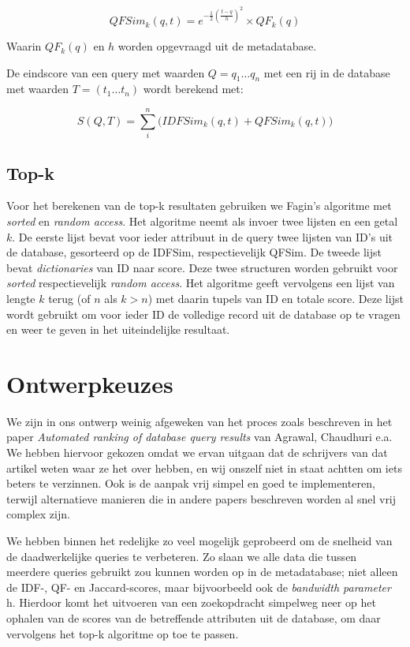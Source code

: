 \documentclass[a4paper,oneside]{article}
\begin{document}
$$QFSim_k(q, t) = e^{-\frac{1}{2}\left(\frac{t-q}{h}\right)^2}\times QF_k(q)$$

\noindent
Waarin $QF_k(q)$ en $h$ worden opgevraagd uit de metadatabase.

De eindscore van een query met waarden $Q={q_1\ldots q_n}$ met een rij in de database met waarden $T=(t_1\ldots t_n)$ wordt berekend met:

$$S(Q, T) = \sum\limits_i^n \big(IDFSim_k(q, t)+QFSim_k(q, t)\big)$$


\subsection{Top-k}
Voor het berekenen van de top-k resultaten gebruiken we Fagin's algoritme met \emph{sorted} en \emph{random access}. Het algoritme neemt als invoer twee lijsten en een getal $k$. De eerste lijst bevat voor ieder attribuut in de query twee lijsten van ID's uit de database, gesorteerd op de IDFSim, respectievelijk QFSim. De tweede lijst bevat \emph{dictionaries} van ID naar score. Deze twee structuren worden gebruikt voor \emph{sorted} respectievelijk \emph{random access}. Het algoritme geeft vervolgens een lijst van lengte $k$ terug (of $n$ als $k > n$) met daarin tupels van ID en totale score. Deze lijst wordt gebruikt om voor ieder ID de volledige record uit de database op te vragen en weer te geven in het uiteindelijke resultaat.


\section{Ontwerpkeuzes}
We zijn in ons ontwerp weinig afgeweken van het proces zoals beschreven in het paper \emph{Automated ranking of database query results} van Agrawal, Chaudhuri e.a. We hebben hiervoor gekozen omdat we ervan uitgaan dat de schrijvers van dat artikel weten waar ze het over hebben, en wij onszelf niet in staat achtten om iets beters te verzinnen. Ook is de aanpak vrij simpel en goed te implementeren, terwijl alternatieve manieren die in andere papers beschreven worden al snel vrij complex zijn.

We hebben binnen het redelijke zo veel mogelijk geprobeerd om de snelheid van de daadwerkelijke queries te verbeteren. Zo slaan we alle data die tussen meerdere queries gebruikt zou kunnen worden op in de metadatabase; niet alleen de IDF-, QF- en Jaccard-scores, maar bijvoorbeeld ook de \emph{bandwidth parameter} h. Hierdoor komt het uitvoeren van een zoekopdracht simpelweg neer op het ophalen van de scores van de betreffende attributen uit de database, om daar vervolgens het top-k algoritme op toe te passen. 
\end{document}
